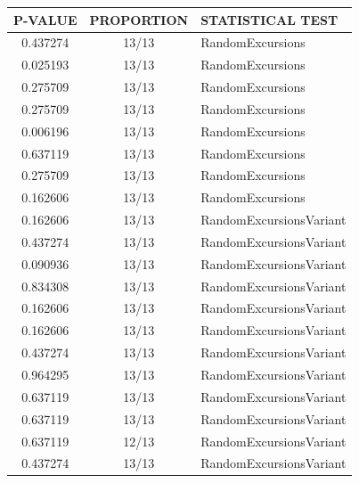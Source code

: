 \documentclass[conference]{IEEEtran}
\begin{document}
\begin{center}
\begin{table}[H]
\renewcommand{\arraystretch}{1.5}
\centering
\begin{tabular}{|c|c|l|}
\hline
\textbf{P-VALUE} & \textbf{PROPORTION} & \textbf{STATISTICAL TEST} \\ \hline
0.437274         & 13/13               & RandomExcursions          \\ \hline
0.025193         & 13/13               & RandomExcursions          \\ \hline
0.275709         & 13/13               & RandomExcursions          \\ \hline
0.275709         & 13/13               & RandomExcursions          \\ \hline
0.006196         & 13/13               & RandomExcursions          \\ \hline
0.637119         & 13/13               & RandomExcursions          \\ \hline
0.275709         & 13/13               & RandomExcursions          \\ \hline
0.162606         & 13/13               & RandomExcursions          \\ \hline
0.162606         & 13/13               & RandomExcursionsVariant   \\ \hline
0.437274         & 13/13               & RandomExcursionsVariant   \\ \hline
0.090936         & 13/13               & RandomExcursionsVariant   \\ \hline
0.834308         & 13/13               & RandomExcursionsVariant   \\ \hline
0.162606         & 13/13               & RandomExcursionsVariant   \\ \hline
0.162606         & 13/13               & RandomExcursionsVariant   \\ \hline
0.437274         & 13/13               & RandomExcursionsVariant   \\ \hline
0.964295         & 13/13               & RandomExcursionsVariant   \\ \hline
0.637119         & 13/13               & RandomExcursionsVariant   \\ \hline
0.637119         & 13/13               & RandomExcursionsVariant   \\ \hline
0.637119         & 12/13               & RandomExcursionsVariant   \\ \hline
0.437274         & 13/13               & RandomExcursionsVariant   \\ \hline

\end{tabular}
\end{table}
\end{center}
\end{document}
